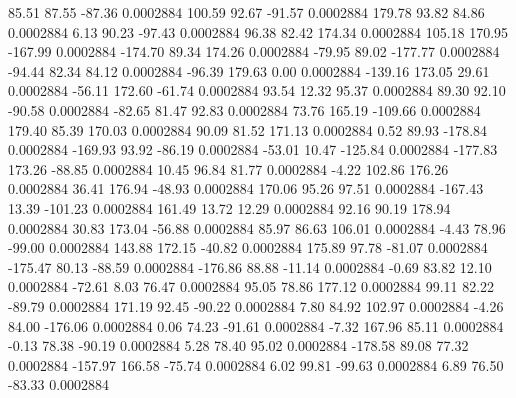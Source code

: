        85.51       87.55      -87.36     0.0002884
      100.59       92.67      -91.57     0.0002884
      179.78       93.82       84.86     0.0002884
        6.13       90.23      -97.43     0.0002884
       96.38       82.42      174.34     0.0002884
      105.18      170.95     -167.99     0.0002884
     -174.70       89.34      174.26     0.0002884
      -79.95       89.02     -177.77     0.0002884
      -94.44       82.34       84.12     0.0002884
      -96.39      179.63        0.00     0.0002884
     -139.16      173.05       29.61     0.0002884
      -56.11      172.60      -61.74     0.0002884
       93.54       12.32       95.37     0.0002884
       89.30       92.10      -90.58     0.0002884
      -82.65       81.47       92.83     0.0002884
       73.76      165.19     -109.66     0.0002884
      179.40       85.39      170.03     0.0002884
       90.09       81.52      171.13     0.0002884
        0.52       89.93     -178.84     0.0002884
     -169.93       93.92      -86.19     0.0002884
      -53.01       10.47     -125.84     0.0002884
     -177.83      173.26      -88.85     0.0002884
       10.45       96.84       81.77     0.0002884
       -4.22      102.86      176.26     0.0002884
       36.41      176.94      -48.93     0.0002884
      170.06       95.26       97.51     0.0002884
     -167.43       13.39     -101.23     0.0002884
      161.49       13.72       12.29     0.0002884
       92.16       90.19      178.94     0.0002884
       30.83      173.04      -56.88     0.0002884
       85.97       86.63      106.01     0.0002884
       -4.43       78.96      -99.00     0.0002884
      143.88      172.15      -40.82     0.0002884
      175.89       97.78      -81.07     0.0002884
     -175.47       80.13      -88.59     0.0002884
     -176.86       88.88      -11.14     0.0002884
       -0.69       83.82       12.10     0.0002884
      -72.61        8.03       76.47     0.0002884
       95.05       78.86      177.12     0.0002884
       99.11       82.22      -89.79     0.0002884
      171.19       92.45      -90.22     0.0002884
        7.80       84.92      102.97     0.0002884
       -4.26       84.00     -176.06     0.0002884
        0.06       74.23      -91.61     0.0002884
       -7.32      167.96       85.11     0.0002884
       -0.13       78.38      -90.19     0.0002884
        5.28       78.40       95.02     0.0002884
     -178.58       89.08       77.32     0.0002884
     -157.97      166.58      -75.74     0.0002884
        6.02       99.81      -99.63     0.0002884
        6.89       76.50      -83.33     0.0002884

